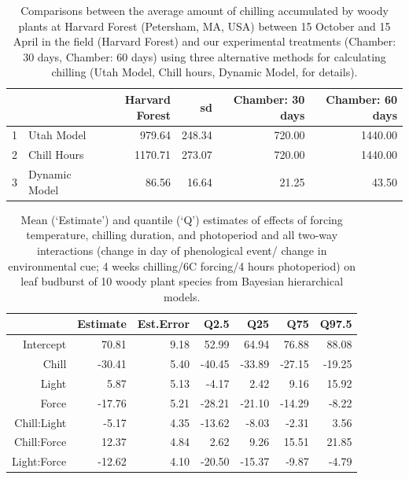 \documentclass{article}\usepackage[]{graphicx}\usepackage[]{color}
\begin{document}
\begin{table}[ht]
\centering
\begin{tabular}{rlrrrr}
  \hline
 &  & Harvard Forest & sd & Chamber: 30 days & Chamber: 60 days \\ 
  \hline
1 & Utah Model & 979.64 & 248.34 & 720.00 & 1440.00 \\ 
  2 & Chill Hours & 1170.71 & 273.07 & 720.00 & 1440.00 \\ 
  3 & Dynamic Model & 86.56 & 16.64 & 21.25 & 43.50 \\ 
   \hline
\end{tabular}
\caption{Comparisons between the average amount of chilling accumulated by woody plants at Harvard Forest (Petersham, MA, USA) between 15 October and 15 April in the field (Harvard Forest) and our experimental treatments (Chamber: 30 days, Chamber: 60 days)  using three alternative methods for calculating chilling (Utah Model, Chill hours, Dynamic Model, \citep[see][]{Luedeling:2011ab} for details).}
 \label{tab:chillcomps}
 \end{table}

\begin{table}[ht]
\centering
\begin{tabular}{rrrrrrr}
  \hline
 & Estimate & Est.Error & Q2.5 & Q25 & Q75 & Q97.5 \\ 
  \hline
Intercept & 70.81 & 9.18 & 52.99 & 64.94 & 76.88 & 88.08 \\ 
  Chill & -30.41 & 5.40 & -40.45 & -33.89 & -27.15 & -19.25 \\ 
  Light & 5.87 & 5.13 & -4.17 & 2.42 & 9.16 & 15.92 \\ 
  Force & -17.76 & 5.21 & -28.21 & -21.10 & -14.29 & -8.22 \\ 
  Chill:Light & -5.17 & 4.35 & -13.62 & -8.03 & -2.31 & 3.56 \\ 
  Chill:Force & 12.37 & 4.84 & 2.62 & 9.26 & 15.51 & 21.85 \\ 
  Light:Force & -12.62 & 4.10 & -20.50 & -15.37 & -9.87 & -4.79 \\ 
   \hline
\end{tabular}
\caption{Mean (`Estimate') and quantile (`Q') estimates of effects of forcing temperature, chilling duration, and photoperiod and all two-way interactions (change in day of phenological event/ change in environmental cue; 4 weeks chilling/6\degree C forcing/4 hours photoperiod) on leaf budburst of 10 woody plant species from Bayesian hierarchical models.}
\label{tab:modelests}
\end{table}
\end{document}

